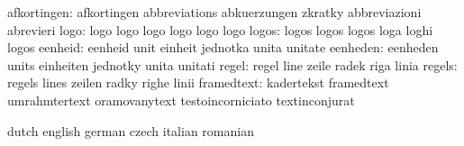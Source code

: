               afkortingen: afkortingen               abbreviations
                           abkuerzungen              zkratky
                           abbreviazioni             abrevieri
                     logo: logo                      logo
                           logo                      logo
                           logo                      logo
                    logos: logos                     logos
                           logos                     loga
                           loghi                     logos
                  eenheid: eenheid                   unit
                           einheit                   jednotka
                           unita                     unitate
                 eenheden: eenheden                  units
                           einheiten                 jednotky
                           unita                     unitati
                    regel: regel                     line
                           zeile                     radek
                           riga                      linia
                   regels: regels                    lines
                           zeilen                    radky
                           righe                     linii
               framedtext: kadertekst                framedtext
                           umrahmtertext             oramovanytext
                           testoincorniciato         textinconjurat

\stopvariables




\startconstants            dutch                     english
                           german                    czech
                           italian                   romanian

